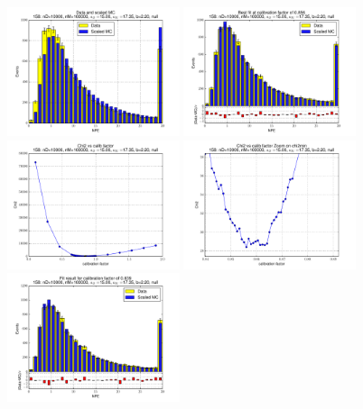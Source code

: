 
 \begin{figure}[htbp] \begin{center} 
\includegraphics[width=0.45\textwidth]{../FIGURES/158/FIG_Data_and_scaled_MC.pdf} 
\includegraphics[width=0.45\textwidth]{../FIGURES/158/FIG_Best_fit_at_calibration_factor_of_0_856.pdf} 
\includegraphics[width=0.45\textwidth]{../FIGURES/158/FIG_Chi2_vs_calib_factor.pdf} 
\includegraphics[width=0.45\textwidth]{../FIGURES/158/FIG_Chi2_vs_calib_factor_Zoom_on_chi2min.pdf} 
\includegraphics[width=0.45\textwidth]{../FIGURES/158/FIG_Fit_result_for_calibration_factor_of_0_839.pdf} 

\end{center}
\end{figure}
